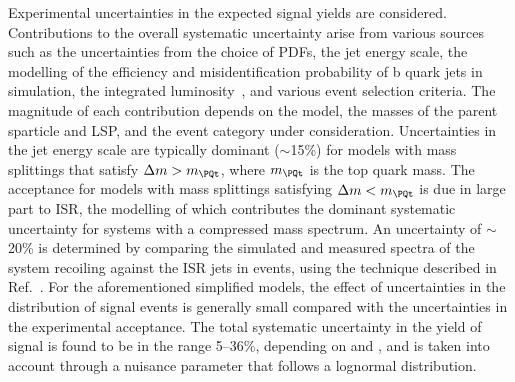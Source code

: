 Experimental uncertainties in the expected signal yields are
considered. Contributions to the overall systematic uncertainty arise
from various sources such as the uncertainties from the choice of
PDFs, the jet energy scale, the modelling of the efficiency and
misidentification probability of b quark jets in simulation, the
integrated luminosity~\cite{lumi}, and various event selection
criteria. The magnitude of each contribution depends on the model, the
masses of the parent sparticle and LSP, and the event category under
consideration. Uncertainties in the jet energy scale are typically
dominant ($\sim$15\%) for models with mass splittings that satisfy
$\dm > m_\PQt$, where $m_\PQt$ is the top quark mass. The acceptance
for models with mass splittings satisfying $\dm < m_\PQt$ is due in
large part to ISR, the modelling of which contributes the dominant
systematic uncertainty for systems with a compressed mass spectrum. An
uncertainty of $\sim$20\% is determined by comparing the simulated and
measured \pt spectra of the system recoiling against the ISR jets in
\ttbar events, using the technique described in
Ref.~\cite{single-lepton-stop}. For the aforementioned simplified
models, the effect of uncertainties in the distribution of signal
events is generally small compared with the uncertainties in the
experimental acceptance. The total systematic uncertainty in the yield
of signal is found to be in the range 5--36\%, depending on \njet and
\nb, and is taken into account through a nuisance parameter that
follows a lognormal distribution.

